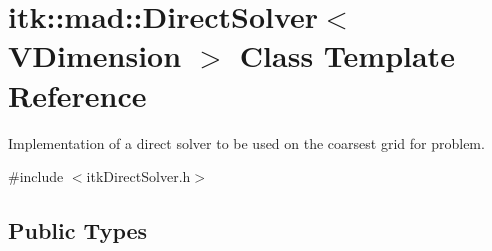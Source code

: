 \hypertarget{classitk_1_1mad_1_1_direct_solver}{\section{itk\-:\-:mad\-:\-:Direct\-Solver$<$ V\-Dimension $>$ Class Template Reference}
\label{classitk_1_1mad_1_1_direct_solver}
}


Implementation of a direct solver to be used on the coarsest grid for problem.  




{\ttfamily \#include $<$itk\-Direct\-Solver.\-h$>$}

\subsection*{Public Types}
